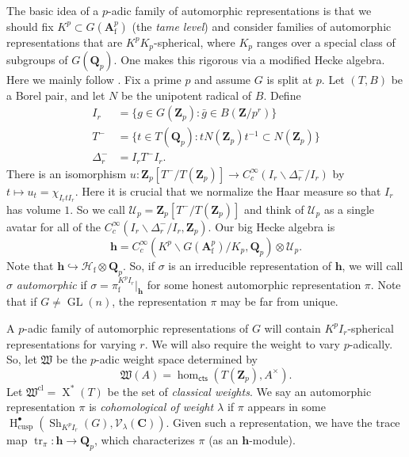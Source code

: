 \documentclass[oneside]{amsart}
\DeclareMathOperator{\character}{X}
\DeclareMathOperator{\GL}{GL}
\DeclareMathOperator{\h}{H}
\DeclareMathOperator{\shimura}{Sh}
\DeclareMathOperator{\trace}{tr}
\newcommand{\cU}{\mathcal{U}}
\newcommand{\dA}{\mathbf{A}}
\newcommand{\dC}{\mathbf{C}}
\newcommand{\dQ}{\mathbf{Q}}
\newcommand{\dZ}{\mathbf{Z}}
\newcommand{\fW}{\mathfrak{W}}
\newcommand{\sV}{\mathscr{V}}
\newcommand{\classical}{\mathrm{cl}}
\newcommand{\cusp}{\mathrm{cusp}}
\newcommand{\finite}{\mathrm{f}}
\newcommand{\hecke}{\mathcal{H}}
\newcommand{\hida}{\mathbf{h}}
\begin{document}
The basic idea of a $p$-adic family of automorphic representations is that 
we should fix $K^p\subset G(\dA^p_\finite)$ (the \emph{tame level}) and consider 
families of automorphic representations that are $K^p K_p$-spherical, where $K_p$ 
ranges over a special class of subgroups of $G(\dQ_p)$. One makes this rigorous 
via a modified Hecke algebra. Here we mainly follow \cite[4.1]{urban-2011}. 
Fix a prime $p$ and assume $G$ is split at $p$. Let $(T,B)$ be a Borel pair, 
and let $N$ be the unipotent radical of $B$. Define 
\begin{align*}
  I_r &= \{g\in G(\dZ_p):\bar g\in B(\dZ/p^r)\} \\
  T^- &= \{t\in T(\dQ_p):t N(\dZ_p) t^{-1} \subset N(\dZ_p)\} \\
  \Delta_r^- &= I_r T^- I_r .
\end{align*}
There is an isomorphism 
$u:\dZ_p[T^-/T(\dZ_p)]\to C_c^\infty(I_r \backslash \Delta_r^- / I_r)$ by 
$t\mapsto u_t=\chi_{I_r t I_r}$. Here it is crucial that we normalize the 
Haar measure so that $I_r$ has volume $1$. So we call 
$\cU_p=\dZ_p[T^-/T(\dZ_p)]$ and think of $\cU_p$ as a single avatar for all 
of the $C_c^\infty(I_r \backslash \Delta_r^- / I_r,\dZ_p)$. Our big Hecke 
algebra is 
\[
  \hida = C_c^\infty(K^p\backslash G(\dA_\finite^p)/K_p,\dQ_p)\otimes \cU_p .
\]
Note that $\hida\hookrightarrow \hecke_\finite\otimes \dQ_p$. So, if 
$\sigma$ is an irreducible representation of $\hida$, we will call $\sigma$ 
\emph{automorphic} if $\sigma=\pi_\finite^{K^p I_r}|_\hida$ for some honest 
automorphic representation $\pi$. Note that if $G\ne \GL(n)$, the 
representation $\pi$ may be far from unique. 

A $p$-adic family of automorphic representations of $G$ will contain 
$K^p I_r$-spherical representations for varying $r$. We will also require the 
weight to vary $p$-adically. So, let $\fW$ be the $p$-adic weight space 
determined by 
\[
  \fW(A) = \hom_\mathsf{cts}(T(\dZ_p),A^\times) .
\]
Let $\fW^\classical=\character^\ast(T)$ be the set of \emph{classical 
weights}. We say an automorphic representation $\pi$ is \emph{cohomological of 
weight $\lambda$} if $\pi$ appears in some 
$\h_\cusp^\bullet(\shimura_{K^p I_r}(G),\sV_\lambda(\dC))$. Given such a 
representation, we have the trace map $\trace_\pi:\hida\to \dQ_p$, which 
characterizes $\pi$ (as an $\hida$-module). 
\end{document}
